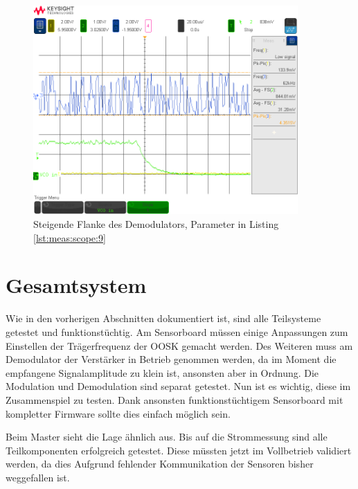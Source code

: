 \begin{figure}[h!tb]
    \centering
    \includegraphics[width=0.9\textwidth, trim=0mm 21mm 0mm 11mm, clip]{images/scopeShots/scope_9b.png}
    \caption{Steigende Flanke  des Demodulators, Parameter in Listing \ref{lst:meas:scope:9}}
    \label{fig:meas:scope:9}
\end{figure}


\clearpage
\section{Gesamtsystem}
\label{sec:validierung:total}

Wie  in den  vorherigen Abschnitten  dokumentiert ist,  sind alle  Teilsysteme
getestet und  funktionst\"uchtig.  Am Sensorboard m\"ussen  einige Anpassungen
zum Einstellen der Tr\"agerfrequenz der OOSK gemacht werden. Des Weiteren muss
am Demodulator der  Verst\"arker in Betrieb genommen werden, da  im Moment die
empfangene  Signalamplitude zu  klein  ist, ansonsten  aber  in Ordnung.   Die
Modulation und Demodulation  sind separat getestet. Nun ist  es wichtig, diese
im  Zusammenspiel zu  testen. Dank ansonsten  funktionst\"uchtigem Sensorboard
mit kompletter Firmware sollte dies einfach m\"oglich sein.

Beim Master sieht  die Lage \"ahnlich aus. Bis auf die  Strommessung sind alle
Teilkomponenten  erfolgreich getestet. Diese  m\"ussten  jetzt im  Vollbetrieb
validiert werden, da dies Aufgrund fehlender Kommunikation der Sensoren bisher
weggefallen ist.

